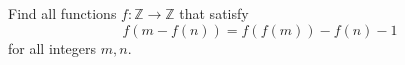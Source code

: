 \documentclass[11pt]{scrartcl}
\begin{document}
\begin{itemize}[label=,itemsep=0.4em,leftmargin=0em]
\begin{comment}
    Therefore, \( i - g(i) < 0 \) and \( i < \frac{-2}{3} \).

    Hence, all functions that satisfy the conditions are \( \boxed{f(x) = 0 ,\xr}, \boxed{f(x) = 0 ,\xr} \) and 
    \[
    \boxed{ f(x)=
    \left\{\begin{array}{rr}-1,&x\in \left(-\infty,-\frac{2}{3}\right)\\
        1,&x\not\in \left(-\infty,-\frac{2}{3}\right)
    \end{array}
    \right.
    }
    \]

    \end{comment}
     \begin{btvn}
        Find all functions $f: \mathbb{Z} \to \mathbb{Z}$ that satisfy
        \[
           f(m - f(n))  = f(f( m)) - f(n) -1\tag{1}
        \]
        for all integers $m,n$.
    \end{btvn}
    \begin{comment}
        Denote $P(m,n)$ as the substitution into $(1)$. 
        With $f(m) = -1, \forall m \in \mathbb{Z}$ it is satisfied, assuming there exists $m_0$ such that $f(m_0) \neq -1$.

        $P(m,f(m)) \ra f(m - f(f(m))) = -1$. It follows that there exists $a \in \mathbb{Z}$ such that $f(a) = -1$. 

        $P(m,a) \ra f(m + 1) = f(f(m)), \forall m,n \in \mathbb{Z} (2)$

        Rewriting, we have 
        \[
            f(m - f(n)) = f(m + 1) - f(n) - 1, \forall m,n \in \mathbb{Z}
        \]
        Let $k = f(n) + 1$. Replacing $m \to m + f(n)$ we get 
        \[
            f(m) = f(m + k) - k \lra f(m + k) = f(m) + k
        \]
        By induction, we can prove $f(m + nk) = f(m) + nk, n \in \mathbb{Z^+}$

        Replacing $m \to m - nk$ we get $f(m - nk) = f(m) - nk, \forall n \in \mathbb{Z^+}$. Thus,
        \[
            f(m + nk) = f(m) + nk, \forall m,n \in \mathbb{Z}
        \]
        Assuming there exist $f(a) = f(b)$ and $a > b$. We have 
        \[
            f(a + 1) = f(f(a)) = f(f(b)) = f(b + 1)
        \]
        Similarly, we also have $f(a + 2) = f(b + 2)$. By induction, we can prove $f(n + a) = f(n + b), \forall n \in \mathbb{N}$. Let $d = a - b$, substituting $n \to n - b$ we get 
        \[
            f(n) = f(n + d) = \dots = f(n + tkd) = f(n) + tkd, \forall t \in \mathbb{Z^+}
        \]
        This is absurd, thus $d = 0$ and $f$ is injective. From $(2)$, it follows that $f(m) = m + 1$.


\end{comment}
\end{itemize}
\end{document}
